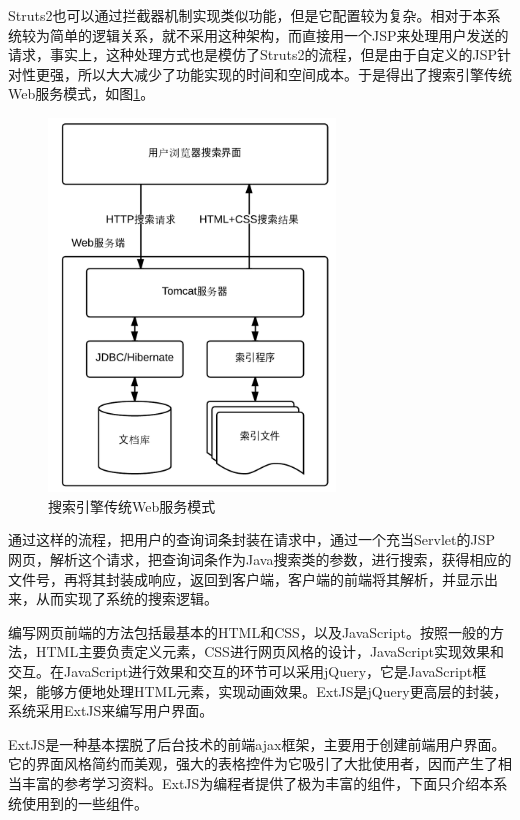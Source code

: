 \documentclass[12pt,a4paper]{article}
\newcommand{\wuhao}{\fontsize{10.5pt}{\baselineskip}\selectfont}
\begin{document}
	{\Times Struts2}也可以通过拦截器机制实现类似功能，但是它配置较为复杂。相对于本系统较为简单的逻辑关系，就不采用这种架构，而直接用一个{\Times JSP}来处理用户发送的请求，事实上，这种处理方式也是模仿了{\Times Struts2}的流程，但是由于自定义的{\Times JSP}针对性更强，所以大大减少了功能实现的时间和空间成本。于是得出了搜索引擎传统{\Times Web}服务模式，如图\ref{fig:搜索引擎传统Web服务模式}。
	\begin{figure}[htbp] 
	\centering\includegraphics[width=3in]{fig/SearchStructure.png} 
	\caption{\wuhao 搜索引擎传统{\Times Web}服务模式}\label{fig:搜索引擎传统Web服务模式} 
	\end{figure} 
	
	通过这样的流程，把用户的查询词条封装在请求中，通过一个充当{\Times Servlet}的{\Times JSP} 网页，解析这个请求，把查询词条作为{\Times Java}搜索类的参数，进行搜索，获得相应的文件号，再将其封装成响应，返回到客户端，客户端的前端将其解析，并显示出来，从而实现了系统的搜索逻辑。
	
	编写网页前端的方法包括最基本的{\Times HTML}和{\Times CSS}，以及{\Times JavaScript}。按照一般的方法，{\Times HTML}主要负责定义元素，{\Times CSS}进行网页风格的设计，{\Times JavaScript}实现效果和交互。在{\Times JavaScript}进行效果和交互的环节可以采用{\Times jQuery}，它是{\Times JavaScript}框架，能够方便地处理{\Times HTML}元素，实现动画效果。{\Times ExtJS}是{\Times jQuery}更高层的封装，系统采用{\Times ExtJS}来编写用户界面。
		
	{\Times ExtJS}是一种基本摆脱了后台技术的前端{\Times ajax}框架，主要用于创建前端用户界面。它的界面风格简约而美观，强大的表格控件为它吸引了大批使用者，因而产生了相当丰富的参考学习资料。{\Times ExtJS}为编程者提供了极为丰富的组件，下面只介绍本系统使用到的一些组件。
	
\end{document}
